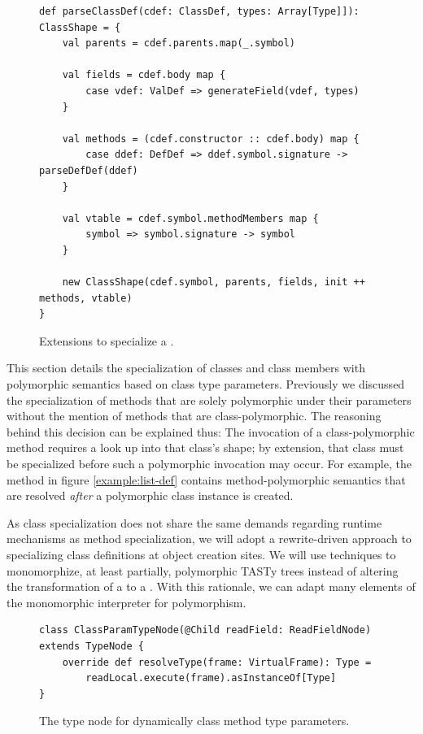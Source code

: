 \begin{figure}[!htb]
\begin{verbatim}
def parseClassDef(cdef: ClassDef, types: Array[Type]]): ClassShape = {
	val parents = cdef.parents.map(_.symbol)
		
	val fields = cdef.body map {
		case vdef: ValDef => generateField(vdef, types)	
	}
	
	val methods = (cdef.constructor :: cdef.body) map {
		case ddef: DefDef => ddef.symbol.signature -> parseDefDef(ddef)
	}
		
	val vtable = cdef.symbol.methodMembers map {
		symbol => symbol.signature -> symbol
	}
		
	new ClassShape(cdef.symbol, parents, fields, init ++ methods, vtable)
}
\end{verbatim}
\caption{Extensions to specialize a .}
\label{impl:specialize-class}
\end{figure}

This section details the specialization of classes and class members with polymorphic semantics based on class type parameters.
Previously we discussed the specialization of methods that are solely polymorphic under their parameters without the mention of methods that are class-polymorphic.
The reasoning behind this decision can be explained thus: The invocation of a class-polymorphic method requires a look up into that class's shape; by extension, that class must be specialized before such a polymorphic invocation may occur.
For example, the method  in figure \ref{example:list-def} contains method-polymorphic semantics that are resolved \textit{after} a polymorphic class instance is created.

As class specialization does not share the same demands regarding runtime mechanisms as method specialization, we will adopt a rewrite-driven approach to specializing class definitions at object creation sites.
We will use techniques to monomorphize, at least partially, polymorphic TASTy trees instead of altering the transformation of a  to a .
With this rationale, we can adapt many elements of the monomorphic interpreter for polymorphism.

\begin{figure}[!htb]
\begin{verbatim}
class ClassParamTypeNode(@Child readField: ReadFieldNode) extends TypeNode {
	override def resolveType(frame: VirtualFrame): Type = 
		readLocal.execute(frame).asInstanceOf[Type]
}
\end{verbatim}
\caption{The type node for dynamically class method type parameters.}
\label{impl:class-param-typenode}
\end{figure}

